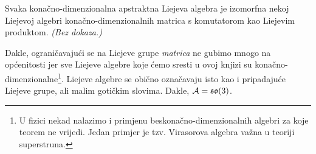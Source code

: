 \begin{teorem}[Ado]  
 Svaka konačno-dimenzionalna apstraktna Liejeva algebra je izomorfna nekoj
 Liejevoj algebri konačno-dimenzionalnih matrica s komutatorom kao Liejevim produktom. \emph{(Bez
 dokaza.)}
\end{teorem}
Dakle, ograničavajući se na Liejeve grupe \emph{matrica} ne gubimo mnogo
na općenitosti jer sve Liejeve algebre koje ćemo sresti u ovoj knjizi su
konačno-dimenzionalne\footnote{U fizici nekad nalazimo i primjenu beskonačno-dimenzionalnih
algebri za koje teorem ne vrijedi. Jedan primjer je tzv. Virasorova algebra važna
u teoriji superstruna. }.
Liejeve algebre se obično označavaju isto kao i pripadajuće Liejeve grupe, ali malim gotičkim slovima.
Dakle, $\mathcal{A} = \mathfrak{so}(3)$. 

